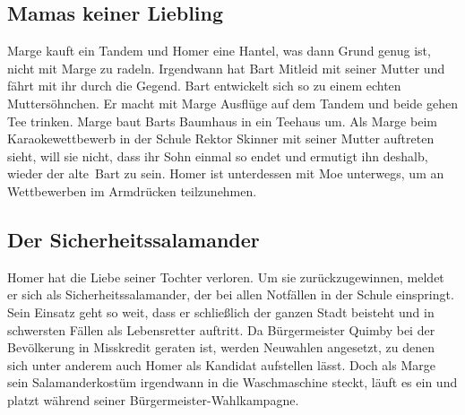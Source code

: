 
\subsection{Mamas keiner Liebling}
Marge kauft ein Tandem und Homer eine Hantel, was dann Grund genug ist, nicht mit Marge zu radeln. Irgendwann hat Bart Mitleid mit seiner Mutter und fährt mit ihr durch die Gegend. Bart entwickelt sich so zu einem echten Muttersöhnchen. Er macht mit Marge Ausflüge auf dem Tandem und beide gehen Tee trinken. Marge baut Barts Baumhaus in ein Teehaus um. Als Marge beim Karaokewettbewerb in der Schule Rektor Skinner mit seiner Mutter auftreten sieht, will sie nicht, dass ihr Sohn einmal so endet und ermutigt ihn deshalb, wieder der \glqq alte\grqq\ Bart zu sein. Homer ist unterdessen mit Moe unterwegs, um an Wettbewerben im Armdrücken teilzunehmen.


\subsection{Der Sicherheitssalamander}\label{GABF21}
Homer hat die Liebe seiner Tochter verloren. Um sie zurückzugewinnen, meldet er sich als \glqq Sicherheitssalamander\grqq , der bei allen Notfällen in der Schule einspringt. Sein Einsatz geht so weit, dass er schließlich der ganzen Stadt beisteht und in schwersten Fällen als Lebensretter auftritt.
Da Bürgermeister Quimby bei der Bevölkerung in Misskredit geraten ist, werden Neuwahlen angesetzt, zu denen sich unter anderem auch Homer als Kandidat aufstellen lässt. Doch als Marge sein Salamanderkostüm irgendwann in die Waschmaschine steckt, läuft es ein und platzt während seiner Bürgermeister-Wahlkampagne.

